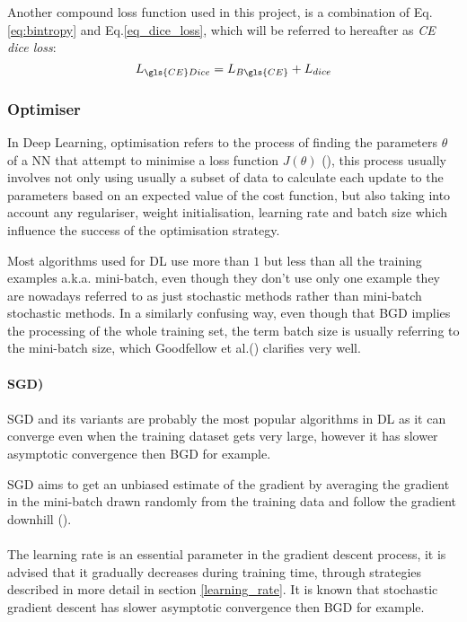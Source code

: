 Another compound loss function used in this project, is a combination of Eq.\ref{eq:bintropy} and Eq.\ref{eq_dice_loss}, which will be referred to hereafter as \textit{\gls{CE} dice loss}:
\begin{equation}
L_{\gls{CE} Dice} = L_{B\gls{CE}} + L_{dice}
\end{equation}

\subsubsection{Optimiser} \label{optimiser}
In Deep Learning, optimisation refers to the process of finding the parameters $\theta$ of a \gls{NN} that attempt to minimise a loss function $J(\theta)$ (\cite{GoodBengCour16}), this process usually involves not only using usually a subset of data to calculate each update to the parameters based on an expected value of the cost function, but also taking into account any regulariser, weight initialisation, learning rate and batch size which influence the success of the optimisation strategy.


Most algorithms used for \gls{DL} use more than $1$ but less than all the training examples \gls{a.k.a.} mini-batch, even though they don't use only one example they are nowadays referred to as just stochastic methods rather than mini-batch stochastic methods. In a similarly confusing way, even though that \gls{BGD} implies the processing of the whole training set, the term batch size is usually referring to the mini-batch size, which Goodfellow et al.(\cite{GoodBengCour16}) clarifies very well.

\paragraph{\gls{SGD})}
\paragraph{}
\gls{SGD} and its variants are probably the most popular algorithms in \gls{DL} as it can converge even when the training dataset gets very large, however it has slower asymptotic convergence then \gls{BGD} for example.

\gls{SGD} aims to get an unbiased estimate of the gradient by averaging the gradient in the mini-batch drawn randomly from the training data and follow the gradient downhill (\cite{GoodBengCour16}).

\paragraph{}
The learning rate is an essential parameter in the gradient descent process, it is advised that it gradually decreases during training time, through strategies described in more detail in section \ref{learning_rate}. It is known that stochastic gradient descent has slower asymptotic convergence then \gls{BGD} for example.

